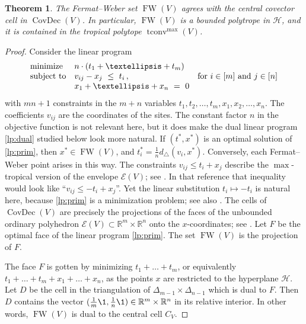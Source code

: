 \documentclass[a4paper,12pt]{amsart}
\newcommand\RR{{\mathbb R}}
\newcommand\cE{{\mathcal E}}
\newcommand\cH{{\mathcal H}}
\DeclareMathOperator\tconv{tconv}
\DeclareMathOperator{\FW}{FW} %
\DeclareMathOperator\CovDec{CovDec} %
\newtheorem{theorem}{Theorem}
\theoremstyle{remark}
\begin{document}
\begin{theorem} \label{thm:convFW}
  The Fermat--Weber set $\FW(V)$ agrees with the central covector cell in $\CovDec(V)$.
  In particular, $\FW(V)$ is a bounded polytrope in $\cH$, and it is contained in the tropical polytope $\tconv^{\max}(V)$.
\end{theorem}
\begin{proof}
  Consider the linear program
  \begin{equation} \label{lp:prim}
    \begin{array}{ll@{}ll}
      \text{minimize}  & \displaystyle  n \cdot (t_{1} + \dots +  t_{m}) & \\
      \text{subject to}& \displaystyle v_{ij} - x_j \ \leq \ t_i \,, & \quad \text{for } i\in[m] \text{ and } j\in[n] \\
                       & \displaystyle x_{1} + \dots + x_{n} \ = \ 0  &
    \end{array}
  \end{equation}
  with $mn+1$ constraints in the $m+n$ variables $t_1,t_2,\dots,t_m,x_1,x_2,\dots, x_n$.
  The coefficients $v_{ij}$ are the coordinates of the sites.
  The constant factor $n$ in the objective function is not relevant here, but it does make the dual linear program \eqref{lp:dual} studied below look more natural.
  If $(t^*,x^*)$ is an optimal solution of \eqref{lp:prim}, then $x^*\in\FW(V)$, and $t_i^*=\tfrac{1}{n}d_\triangle(v_i,x^*)$.
  Conversely, each Fermat--Weber point arises in this way.
  The constraints $v_{ij} \leq t_i + x_j$ describe the $\max$-tropical version of the envelope $\cE(V)$; see \cite[]{ETC}.
  In that reference that inequality would look like \enquote{$v_{ij} \leq -t_i + x_j$}.
  Yet the linear substitution $t_i\mapsto -t_i$ is natural here, because \eqref{lp:prim} is a minimization problem; see also \cite[Remark 6.28]{ETC}.
  The cells of $\CovDec(V)$ are precisely the projections of the faces of the unbounded ordinary polyhedron $\cE(V)\subset\RR^m\times\RR^n$ onto the $x$-coordinates; see \cite[Proposition 6.11]{ETC}.
  Let $F$ be the optimal face of the linear program \eqref{lp:prim}.
  The set $\FW(V)$ is the projection of $F$.

  The face $F$ is gotten by minimizing $t_{1} + \dots +  t_{m}$, or equivalently $t_{1} + \dots +  t_{m} + x_1 + \dots + x_n$, as the points $x$ are restricted to the hyperplane $\cH$.
  Let $D$ be the cell in the triangulation of $\Delta_{m-1}\times\Delta_{n-1}$ which is dual to $F$.
  Then $D$ contains the vector $(\tfrac{1}{m}\1,\tfrac{1}{n}\1)\in\RR^m\times\RR^n$ in its relative interior.
  In other words, $\FW(V)$ is dual to the central cell $C_V$.


\end{proof}
\end{document}
